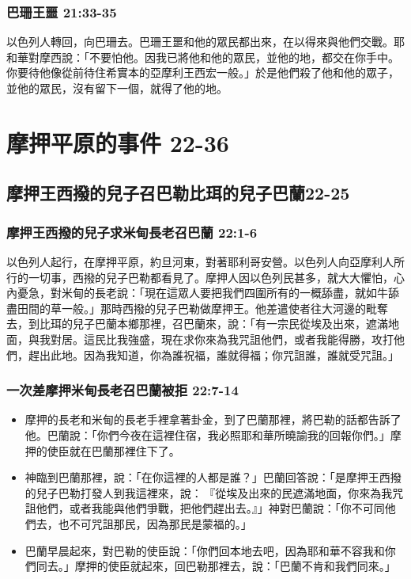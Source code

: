 \subsubsection{巴珊王噩 21:33-35}
以色列人轉回，向巴珊去。巴珊王噩和他的眾民都出來，在以得來與他們交戰。耶和華對摩西說：「不要怕他。因我已將他和他的眾民，並他的地，都交在你手中。你要待他像從前待住希實本的亞摩利王西宏一般。」於是他們殺了他和他的眾子，並他的眾民，沒有留下一個，就得了他的地。

\section{摩押平原的事件 22-36}
\subsection{摩押王西撥的兒子召巴勒比珥的兒子巴蘭22-25}

\subsubsection{摩押王西撥的兒子求米甸長老召巴蘭 22:1-6}
以色列人起行，在摩押平原，約旦河東，對著耶利哥安營。以色列人向亞摩利人所行的一切事，西撥的兒子巴勒都看見了。摩押人因以色列民甚多，就大大懼怕，心內憂急，對米甸的長老說：「現在這眾人要把我們四圍所有的一概舔盡，就如牛舔盡田間的草一般。」那時西撥的兒子巴勒做摩押王。他差遣使者往大河邊的毗奪去，到比珥的兒子巴蘭本鄉那裡，召巴蘭來，說：「有一宗民從埃及出來，遮滿地面，與我對居。這民比我強盛，現在求你來為我咒詛他們，或者我能得勝，攻打他們，趕出此地。因為我知道，你為誰祝福，誰就得福；你咒詛誰，誰就受咒詛。」

\subsubsection{一次差摩押米甸長老召巴蘭被拒 22:7-14}
\begin{itemize} 
\itemsep-.35em
\item 摩押的長老和米甸的長老手裡拿著卦金，到了巴蘭那裡，將巴勒的話都告訴了他。巴蘭說：「你們今夜在這裡住宿，我必照耶和華所曉諭我的回報你們。」摩押的使臣就在巴蘭那裡住下了。
\item 神臨到巴蘭那裡，說：「在你這裡的人都是誰？」巴蘭回答說：「是摩押王西撥的兒子巴勒打發人到我這裡來，說： 『從埃及出來的民遮滿地面，你來為我咒詛他們，或者我能與他們爭戰，把他們趕出去。』」神對巴蘭說：「你不可同他們去，也不可咒詛那民，因為那民是蒙福的。」
\item 巴蘭早晨起來，對巴勒的使臣說：「你們回本地去吧，因為耶和華不容我和你們同去。」摩押的使臣就起來，回巴勒那裡去，說：「巴蘭不肯和我們同來。」
\end{itemize}

